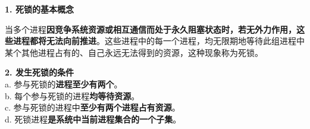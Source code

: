 {\textbf{1. 死锁的基本概念}}

{当多个进程\textbf{因竞争系统资源或相互通信而处于永久阻塞状态时，若无外力作用，这些进程都将无法向前推进}。}这些进程中的每一个进程，均无限期地等待此组进程中某个其他进程占有的、自己永远无法得到的资源，这种现象称为死锁。

{{\textbf{2. 发生死锁的条件}}}\\
a. 参与死锁的{\textbf{进程至少有两个}}。\\
b. 每个参与死锁的进程{\textbf{均等待资源}}。\\
c. 参与死锁的进程中{\textbf{至少有两个进程占有资源}}。\\
d. 死锁进程\textbf{{是系统中当前进程集合的一个子集}}。\\
